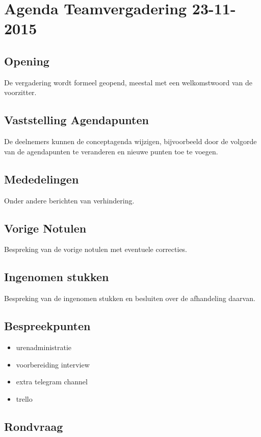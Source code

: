 \documentclass[dutch]{hu}
\subtitle{Agenda Teamvergadering \vergaderingDatum}
\def \vergaderingDatum{23-11-2015}
\begin{document}
\maketitle
\chapter{Agenda Teamvergadering \vergaderingDatum}
\section{Opening}
De vergadering wordt formeel geopend, meestal met een welkomstwoord van de voorzitter.

\section{Vaststelling Agendapunten}
De deelnemers kunnen de conceptagenda wijzigen, bijvoorbeeld door de volgorde van de agendapunten te veranderen en nieuwe punten toe te voegen.

\section{Mededelingen}
Onder andere berichten van verhindering.

\section{Vorige Notulen}
Bespreking van de vorige notulen met eventuele correcties.

\section{Ingenomen stukken}
Bespreking van de ingenomen stukken en besluiten over de afhandeling daarvan.

\section{Bespreekpunten}
\begin{itemize}
\item urenadministratie
\item voorbereiding interview
\item extra telegram channel
\item trello
\end{itemize}

\section{Rondvraag}
\end{document}
